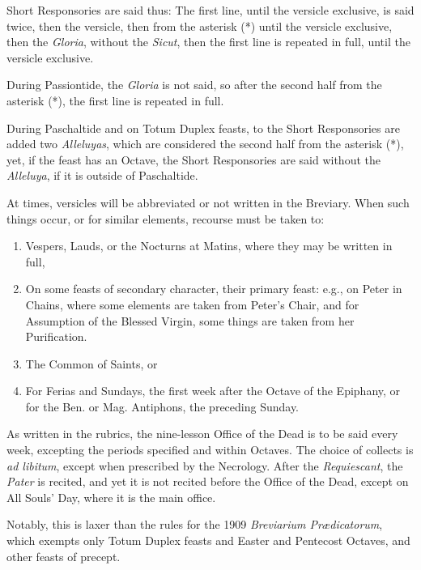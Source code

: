 Short Responsories are said thus: The first line, until the versicle exclusive, is said twice, then the versicle, then from the asterisk (*) until the versicle exclusive, then the \emph{Gloria}, without the \emph{Sicut}, then the first line is repeated in full, until the versicle exclusive.

During Passiontide, the \emph{Gloria} is not said, so after the second half from the asterisk (*), the first line is repeated in full.

During Paschaltide and on Totum Duplex feasts, to the Short Responsories are added two \emph{Alleluyas}, which are considered the second half from the asterisk (*), yet, if the feast has an Octave, the Short Responsories are said without the \emph{Alleluya}, if it is outside of Paschaltide.

At times, versicles will be abbreviated or not written in the Breviary. When such things occur, or for similar elements, recourse must be taken to:
\begin{enumerate}[nosep,leftmargin=13pt]
	\item Vespers, Lauds, or the Nocturns at Matins, where they may be written in full,
	\item On some feasts of secondary character, their primary feast: e.g., on Peter in Chains, where some elements are taken from Peter's Chair, and for Assumption of the Blessed Virgin, some things are taken from her Purification.
	\item The Common of Saints, or
	\item For Ferias and Sundays, the first week after the Octave of the Epiphany, or for the Ben. or Mag. Antiphons, the preceding Sunday.
\end{enumerate}

As written in the rubrics, the nine-lesson Office of the Dead is to be said every week, excepting the periods specified and within Octaves. The choice of collects is \emph{ad libitum}, except when prescribed by the Necrology. After the \emph{Requiescant}, the \emph{Pater} is recited, and yet it is not recited before the Office of the Dead, except on All Souls' Day, where it is the main office.

Notably, this is laxer than the rules for the 1909 \emph{Breviarium Pr\ae dicatorum}, which exempts only Totum Duplex feasts and Easter and Pentecost Octaves, and other feasts of precept.

